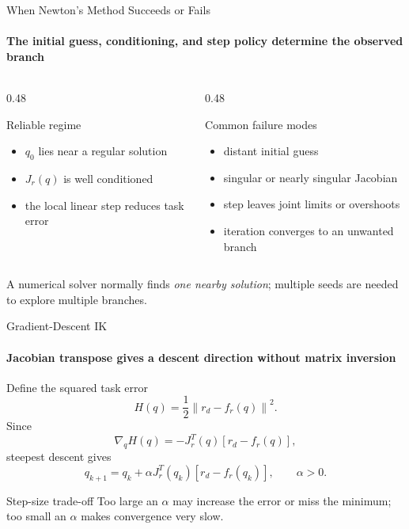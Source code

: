 \documentclass[aspectratio=169]{beamer}
\begin{document}
\begin{frame}[t]{When Newton's Method Succeeds or Fails}
    \framesubtitle{The initial guess, conditioning, and step policy determine the observed branch}
    \begin{columns}[T,onlytextwidth]
        \begin{column}{0.48\textwidth}
            \begin{block}{Reliable regime}
                \begin{itemize}
                    \item $q_0$ lies near a regular solution
                    \item $J_r(q)$ is well conditioned
                    \item the local linear step reduces task error
                \end{itemize}
            \end{block}
        \end{column}
        \begin{column}{0.48\textwidth}
            \begin{block}{Common failure modes}
                \begin{itemize}
                    \item distant initial guess
                    \item singular or nearly singular Jacobian
                    \item step leaves joint limits or overshoots
                    \item iteration converges to an unwanted branch
                \end{itemize}
            \end{block}
        \end{column}
    \end{columns}
    \bigskip
    \centering
    A numerical solver normally finds \emph{one nearby solution}; multiple seeds are needed to explore multiple branches.
\end{frame}

\begin{frame}[t]{Gradient-Descent IK}
    \framesubtitle{Jacobian transpose gives a descent direction without matrix inversion}
    Define the squared task error
    \[
        H(q)=\frac{1}{2}\left\|r_d-f_r(q)\right\|^2.
    \]
    Since
    \[
        \nabla_q H(q)=-J_r^T(q)\left[r_d-f_r(q)\right],
    \]
    steepest descent gives
    \[
        q_{k+1}=q_k+\alpha J_r^T(q_k)
        \left[r_d-f_r(q_k)\right],
        \qquad \alpha>0.
    \]
    \begin{block}{Step-size trade-off}
        Too large an $\alpha$ may increase the error or miss the minimum; too small an $\alpha$ makes convergence very slow.
    \end{block}
\end{frame}
\end{document}
